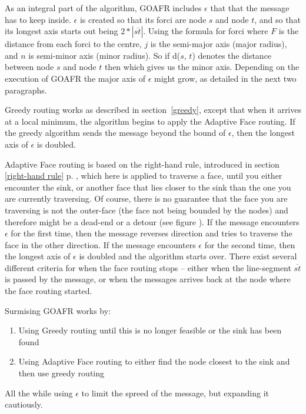 As an integral part of the algorithm, GOAFR includes $\epsilon$ that that the message has to keep inside. $\epsilon$ is created so that its forci are node $s$ and node $t$, and so that its longest axis starts out being $2 * |\overline{st}|$. Using the formula for forci
where $F$ is the distance from each forci to the centre, $j$ is the semi-major axis (major radius), and $n$ is semi-minor axis (minor radius). So if d($s$, $t$) denotes the distance between node $s$ and node $t$ then
which gives us the minor axis. Depending on the execution of GOAFR the major axis of $\epsilon$ might grow, as detailed in the next two paragraphs.

Greedy routing works as described in section~\ref{greedy}, except that when it arrives at a local minimum, the algorithm begins to apply the Adaptive Face routing. If the greedy algorithm sends the message beyond the bound of $\epsilon$, then the longest axis of $\epsilon$ is doubled.

Adaptive Face routing is based on the right-hand rule, introduced in section \ref{right-hand rule} p. \pageref{right-hand rule}, which here is applied to traverse a face, until you either encounter the sink, or another face that lies closer to the sink than the one you are currently traversing. Of course, there is no guarantee that the face you are traversing is not the outer-face (the face not being bounded by the nodes) and therefore might be a dead-end or a detour (see figure ). If the message encounters $\epsilon$ for the first time, then the message reverses direction and tries to traverse the face in the other direction. If the message encounters $\epsilon$ for the second time, then the longest axis of $\epsilon$ is doubled and the algorithm starts over. There exist several different criteria for when the face routing stops -- either when the line-segment $\overline{st}$ is passed by the message, or when the messages arrives back at the node where the face routing started.

Surmising GOAFR works by:
\begin{enumerate}
\item Using Greedy routing until this is no longer feasible or the sink has been found
\item Using Adaptive Face routing to either find the node closest to the sink and then use greedy routing
\end{enumerate}
All the while using $\epsilon$ to limit the spreed of the message, but expanding it cautiously.

